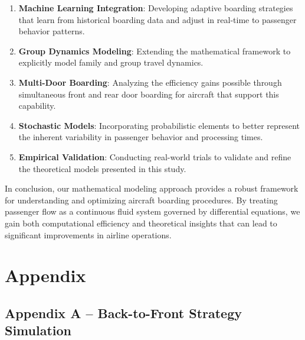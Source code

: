 \documentclass[12pt]{article}
\begin{document}
\begin{enumerate}
    \item \textbf{Machine Learning Integration}: Developing adaptive boarding strategies that learn from historical boarding data and adjust in real-time to passenger behavior patterns.
    
    \item \textbf{Group Dynamics Modeling}: Extending the mathematical framework to explicitly model family and group travel dynamics.
    
    \item \textbf{Multi-Door Boarding}: Analyzing the efficiency gains possible through simultaneous front and rear door boarding for aircraft that support this capability.
    
    \item \textbf{Stochastic Models}: Incorporating probabilistic elements to better represent the inherent variability in passenger behavior and processing times.
    
    \item \textbf{Empirical Validation}: Conducting real-world trials to validate and refine the theoretical models presented in this study.
\end{enumerate}

In conclusion, our mathematical modeling approach provides a robust framework for understanding and optimizing aircraft boarding procedures. By treating passenger flow as a continuous fluid system governed by differential equations, we gain both computational efficiency and theoretical insights that can lead to significant improvements in airline operations.

\appendix
\section{Appendix}

\subsection{Appendix A – Back-to-Front Strategy Simulation}
\end{document}
